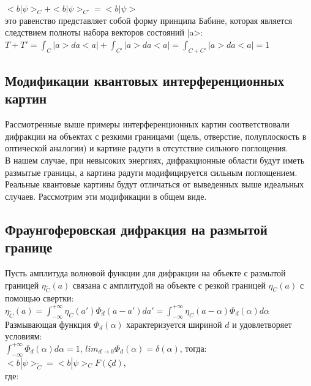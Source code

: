 \documentclass[11pt]{report}
\begin{document}
$<b|\psi>_C + <b|\psi>_{C' } = <b|\psi>$\\

это равенство представляет собой форму принципа Бабине, которая является следствием полноты набора векторов состояний |a>: \\

$T+T' = \int_C |a>da<a| + \int_{C' }|a>da<a| = \int_{C+C'} |a>da<a| = 1 $\\

\subsection{Модификации квантовых интерференционных картин}
Рассмотренные выше примеры интерференционных картин соответствовали дифракции на объектах с резкими границами (щель, отверстие, полуплоскость в оптической аналогии) и картине радуги в отсутствие сильного поглощения. \\

 В нашем случае, при невысоких энергиях, дифракционные области будут иметь размытые границы, а картина радуги модифицируется сильным поглощением. Реальные квантовые картины будут отличаться от выведенных выше идеальных случаев. Рассмотрим эти модификации в общем виде. \\

\subsection{Фраунгоферовская дифракция на размытой границе}
Пусть амплитуда волновой функции для дифракции на объекте с размытой границей $\eta_{\tilde C}(a) $ связана с амплитудой на объекте с резкой границей $\eta_C(a)$ с помощью свертки: \\

$ \eta_{\tilde C}(a) = \int_{-∞}^{+∞}\eta_C(a')\Phi_d(a-a')da' = \int_{-∞}^{+∞} \eta_C(a-\alpha)\Phi_d(\alpha) d\alpha $ \\

Размывающая функция $\Phi_d(\alpha)$ характеризуется шириной $d$ и удовлетворяет условиям: \\

$\int_{-∞}^{+∞} \Phi_d(\alpha) d\alpha = 1$, $lim_{d \rightarrow 0}\Phi_d(\alpha) = \delta(\alpha)$, тогда: \\

$<b|\psi>_{\tilde C } = <b|\psi>_CF(\zeta d)$,\\

 где: \\
 
\end{document}
